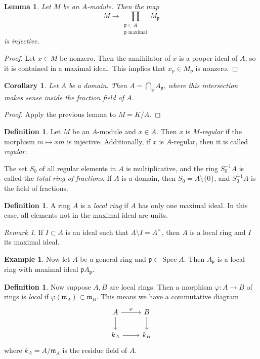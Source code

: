 \documentclass[leqno, openany]{memoir}
\newtheorem{cor}[thm]{Corollary}
\newtheorem{lem}[thm]{Lemma}
\theoremstyle{definition}
\newtheorem{defn}[thm]{Definition}
\newtheorem{exm}[thm]{Example}
\theoremstyle{remark}
\newtheorem{rmk}[thm]{Remark}
\theoremstyle{plain}
\theoremstyle{definition}
\theoremstyle{remark}
\newcommand{\mf}[1]{\mathfrak{#1}}
\DeclareMathOperator{\spec}{Spec}
\begin{document}
\begin{lem}
    Let $M$ be an $A$-module. Then the map 
    \[ M \to \prod_{\substack{ \mf{p} \subset A \\ \mf{p} \text{ maximal}}} M_{\mf{p}} \]
    is injective.
\end{lem}

\begin{proof}
    Let $x \in M$ be nonzero. Then the annihilator of $x$ is a proper ideal of $A$, so it is contained in a maximal ideal. This implies that $x_p \in M_p$ is nonzero.
\end{proof}

\begin{cor}
    Let $A$ be a domain. Then $A = \bigcap_{\mf{p}} A_{\mf{p}}$, where this intersection makes sense inside the fraction field of $A$.
\end{cor}

\begin{proof}
    Apply the previous lemma to $M = K/A$.
\end{proof}

\begin{defn}
    Let $M$ be an $A$-module and $x \in A$. Then $x$ is \textit{$M$-regular} if the morphism $m \mapsto xm$ is injective. Additionally, if $x$ is $A$-regular, then it is called \textit{regular}.
\end{defn}

The set $S_0$ of all regular elements in $A$ is multiplicative, and the ring $S_0^{-1}A$ is called the \textit{total ring of fractions}. If $A$ is a domain, then $S_0 = A \setminus \{0 \}$, and $S_0^{-1}A$ is the field of fractions.

\begin{defn}
    A ring $A$ is a \textit{local ring} if $A$ has only one maximal ideal. In this case, all elements not in the maximal ideal are units.
\end{defn}

\begin{rmk}
    If $I \subset A$ is an ideal such that $A \setminus I = A^{\times}$, then $A$ is a local ring and $I$ its maximal ideal.
\end{rmk}

\begin{exm}
Now let $A$ be a general ring and $\mf{p} \in \spec A$. Then $A_{\mf{p}}$ is a local ring with maximal ideal $\mf{p} A_{\mf{p}}$.
\end{exm}

\begin{defn}
    Now suppose $A,B$ are local rings. Then a morphism $\varphi:A \to B$ of rings is \textit{local} if $\varphi(\mf{m}_A) \subset \mf{m}_B$. This means we have a commutative diagram
    \begin{equation}
    \begin{tikzcd}
        A \arrow{r}{\varphi} \arrow{d} & B \arrow{d} \\
        k_A \arrow{r} & k_B
    \end{tikzcd}
    \end{equation}
    where $k_A = A/ \mf{m}_A$ is the residue field of $A$.
\end{defn}
\end{document}
